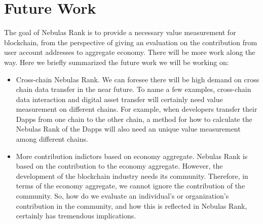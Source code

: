 \section{Future Work}
The goal of Nebulas Rank is to provide a necessary value measurement for blockchain, from the perspective of giving an evaluation on the contribution from user account addresses to aggregate economy. There will be more work along the way. Here we briefly summarized the future work we will be working on:
\begin{itemize}
\item{Cross-chain Nebulas Rank.} We can foresee there will be high demand on cross chain data transfer in the near future. To name a few examples, cross-chain data interaction and digital asset transfer will certainly need value measurement on different chains. For example, when developers transfer their Dapps from one chain to the other chain, a method for how to calculate the Nebulas Rank of the Dapps will also need an unique value measurement among different chains.
\item{More contribution indictors based on economy aggregate.} Nebulas Rank is based on the contribution to the economy aggregate. However, the development of the blockchain industry needs its community. Therefore, in terms of the economy aggregate, we cannot ignore the contribution of the community. So, how do we evaluate an individual’s or organization’s contribution in the community, and how this is reflected in Nebulas Rank, certainly has tremendous implications.


\end{itemize}
